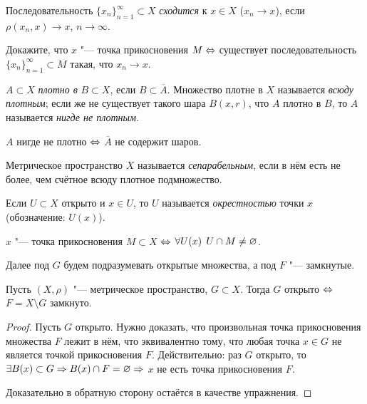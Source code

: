 \documentclass[main]{subfiles}
\begin{document}
\begin{definition}
  Последовательность \( \{ x_n \}_{n=1}^\infty \subset X \)
  \emph{сходится} к \( x \in X \) (\( x_n \to x \)),
  если \( \rho(x_n, x) \to x \), \( n \to \infty \).
\end{definition}

\begin{exercise}
  Докажите, что \( x \) "--- точка прикосновения \( M \Leftrightarrow \)
  существует последовательность \( \{ x_n \}_{n=1}^\infty \subset M \)
  такая, что \( x_n \to x \).
\end{exercise}

\begin{definition}
  \( A \subset X \) \emph{плотно в} \( B \subset X \),
  если \( B \subset \overline{A} \).
  Множество плотне в \( X \) называется \emph{всюду плотным};
  если же не существует такого шара \( B(x, r) \),
  что \( A \) плотно в \( B \),
  то \( A \) называется \emph{нигде не плотным}.
\end{definition}

\begin{proposition}
  \( A \) нигде не плотно \( \Leftrightarrow \) \( \overline{A} \) не содержит шаров.
\end{proposition}

\begin{definition}
  Метрическое пространство \( X \) называется \emph{сепарабельным},
  если в нём есть не более, чем счётное всюду плотное подмножество.
\end{definition}

\begin{definition}
  Если \( U \subset X \) открыто и \( x \in U \), то
  \( U \) называется \emph{окрестностью} точки \( x \)
  (обозначение: \( U(x) \)).
\end{definition}

\begin{proposition}
  \( x \) "--- точка прикосновения \( M \subset X \)
  \( \Leftrightarrow \) \( \forall {U(x)} \; \, U \cap M \ne \varnothing \).
\end{proposition}

Далее под \( G \) будем подразумевать открытые множества,
а под \( F \) "--- замкнутые.

\begin{theorem}
  Пусть \( (X, \rho) \) "--- метрическое пространство,
  \( G \subset X \). Тогда \( G \) открыто \( \Leftrightarrow \)
  \( F = X \setminus G \) замкнуто.
\end{theorem}
\begin{proof}
  Пусть \( G \) открыто. Нужно доказать, что
  произвольная точка прикосновения множества \( F \)
  лежит в нём, что эквивалентно тому, что любая точка
  \( x \in G \) не является точкой прикосновения \( F \).
  Действительно: раз \( G \) открыто, то
  \( \exists B(x) \subset G \Rightarrow B(x) \cap F = \varnothing \Rightarrow \)
  \( x \) не есть точка прикосновения \( F \).

  Доказательно в обратную сторону остаётся в качестве упражнения.
\end{proof}
\end{document}
